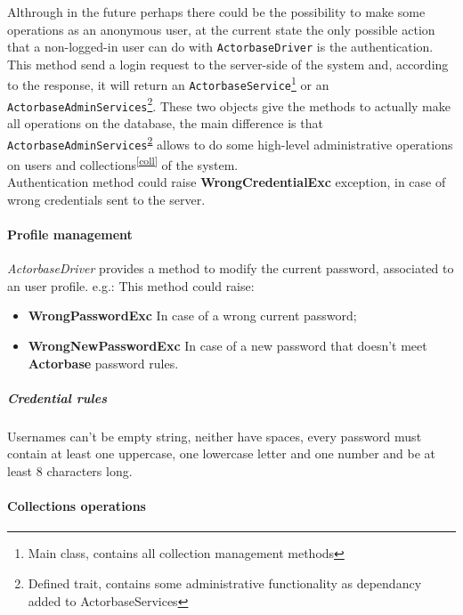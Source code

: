 \documentclass{scalatekids-article}
\begin{document}
Althrough in the future perhaps there could be the possibility to make some
operations as an anonymous user, at the current state the only possible action
that a non-logged-in user can do with \verb=ActorbaseDriver= is the authentication.
This method send a login request to the server-side of the system and, according
to the response, it will return an \verb=ActorbaseService=\footnote{Main class,
  contains all collection management methods\label{ActorbaseServices}} or an
\verb=ActorbaseAdminServices=\footnote{Defined trait, contains some
  administrative functionality as dependancy added to
  ActorbaseServices\label{AdminServices}}. These two objects give the methods to
actually make all operations on the database, the main difference is that
\verb=ActorbaseAdminServices=\textsuperscript{\ref{AdminServices}} allows to do
some high-level administrative operations on users and
collections\textsuperscript{\ref{coll}} of the system.\\
Authentication method could raise \textbf{WrongCredentialExc} exception, in case
of wrong credentials sent to the server.

\paragraph{Profile management}

\textit{ActorbaseDriver} provides a method to modify the current password,
associated to an user profile.
e.g.:
This method could raise:
\begin{itemize}
\item \textbf{WrongPasswordExc} In case of a wrong current password;
\item \textbf{WrongNewPasswordExc} In case of a new password that doesn't meet \textbf{Actorbase} password rules.
\end{itemize}

\subparagraph{Credential rules}
Usernames can't be empty string, neither have spaces, every password must
contain at least one uppercase, one lowercase letter and one number and be at
least 8 characters long.

\paragraph{Collections operations}
\end{document}
